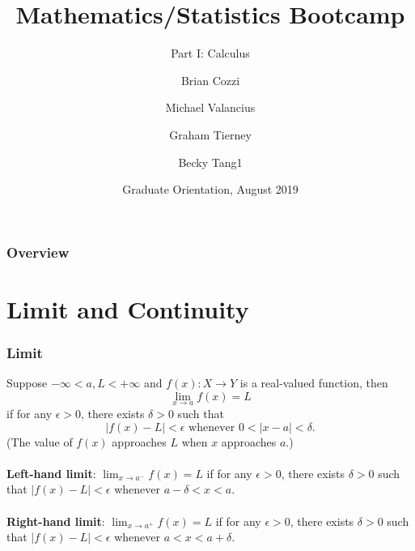 \documentclass{beamer}
\title[Calculus]{Mathematics/Statistics Bootcamp} %
\subtitle{Part I: Calculus}
\author{Brian Cozzi\inst{1} \and Michael Valancius\inst{1} \and Graham Tierney\inst{1} \and Becky Tang{1}}
\institute[Duke University] %
{
  \inst{1}%
  Department of Statistical Science\\
  Duke University
  }
\date{Graduate Orientation, August 2019}
\begin{document}
\begin{frame}
\titlepage %
\end{frame}

\begin{frame}
\frametitle{Overview} %
\tableofcontents %
\end{frame}


\section{Limit and Continuity} %


\begin{frame}
\frametitle{Limit}
Suppose $-\infty < a,L < +\infty$ and $f(x): X \rightarrow Y$ is a real-valued function, then 
$$
\lim_{x\rightarrow a}f(x) = L
$$
if for any $\epsilon > 0$, there exists $\delta > 0$ such that \\
$$
\vert f(x)-L \vert < \epsilon \text{ whenever } 
0 < \vert x-a \vert < \delta.
$$
(The value of $f(x)$ approaches $L$ when $x$ approaches $a$.)
\\~\\
\textbf{Left-hand limit}:
$\lim_{x\rightarrow a^{-}}f(x) = L$ if for any $\epsilon > 0$, there exists $\delta > 0$ such that
$\vert f(x)-L \vert < \epsilon$ whenever
$ a-\delta < x < a$.
\\~\\
\textbf{Right-hand limit}:
$\lim_{x\rightarrow a^{+}}f(x) = L$ if for any $\epsilon > 0$, there exists $\delta > 0$ such that
$\vert f(x)-L \vert < \epsilon$ whenever
$ a < x < a+\delta$.

 \end{frame}
\end{document}
